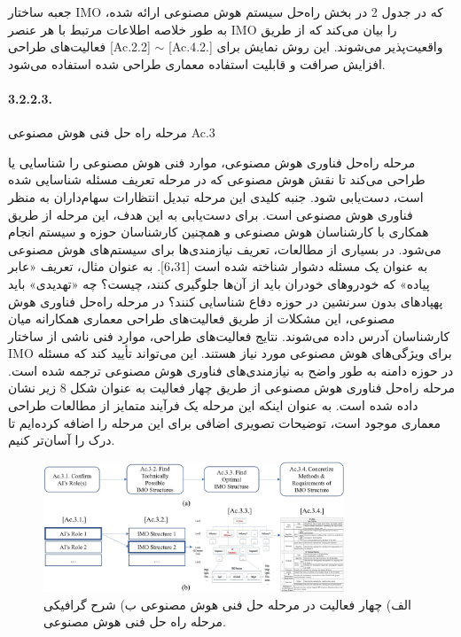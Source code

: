 \documentclass[a4paper,10pt]{article}
\begin{document}
                    جعبه ساختار IMO که در جدول 2 در بخش راه‌حل سیستم هوش مصنوعی ارائه شده، به طور خلاصه اطلاعات مرتبط با هر عنصر IMO را بیان می‌کند که از طریق فعالیت‌های طراحی [Ac.2.2] $\sim$ [Ac.4.2.] واقعیت‌پذیر می‌شوند. این روش نمایش برای افزایش صرافت و قابلیت استفاده معماری طراحی شده استفاده می‌شود.

                    \paragraph{3.2.2.3.}{مرحله راه حل فنی هوش مصنوعی Ac.3}

                    مرحله راه‌حل فناوری هوش مصنوعی، موارد فنی هوش مصنوعی را شناسایی یا طراحی می‌کند تا نقش هوش مصنوعی که در مرحله تعریف مسئله شناسایی شده است، دست‌یابی شود. جنبه کلیدی این مرحله تبدیل انتظارات سهام‌داران به منظر فناوری هوش مصنوعی است. برای دست‌یابی به این هدف، این مرحله از طریق همکاری با کارشناسان هوش مصنوعی و همچنین کارشناسان حوزه و سیستم انجام می‌شود. در بسیاری از مطالعات، تعریف نیازمندی‌ها برای سیستم‌های هوش مصنوعی به عنوان یک مسئله دشوار شناخته شده است [6،31]. به عنوان مثال، تعریف «عابر پیاده» که خودروهای خودران باید از آن‌ها جلوگیری کنند، چیست؟ چه «تهدیدی» باید پهپادهای بدون سرنشین در حوزه دفاع شناسایی کنند؟ در مرحله راه‌حل فناوری هوش مصنوعی، این مشکلات از طریق فعالیت‌های طراحی معماری همکارانه میان کارشناسان آدرس داده می‌شوند. نتایج فعالیت‌های طراحی، موارد فنی ناشی از ساختار IMO برای ویژگی‌های هوش مصنوعی مورد نیاز هستند. این می‌تواند تأیید کند که مسئله در حوزه دامنه به طور واضح به نیازمندی‌های فناوری هوش مصنوعی ترجمه شده است. مرحله راه‌حل فناوری هوش مصنوعی از طریق چهار فعالیت به عنوان شکل 8 زیر نشان داده شده است. به عنوان اینکه این مرحله یک فرآیند متمایز از مطالعات طراحی معماری موجود است، توضیحات تصویری اضافی برای این مرحله را اضافه کرده‌ایم تا درک را آسان‌تر کنیم.

                    \begin{figure}[htbp]

                        \centering
                        \includegraphics[width=0.8\textwidth]{image/fig 8.png}
                        \caption{الف) چهار فعالیت در مرحله حل فنی هوش مصنوعی ب) شرح گرافیکی مرحله راه حل فنی هوش مصنوعی.}
                        \label{fig:fig_8}
                    
                    \end{figure}
\end{document}
